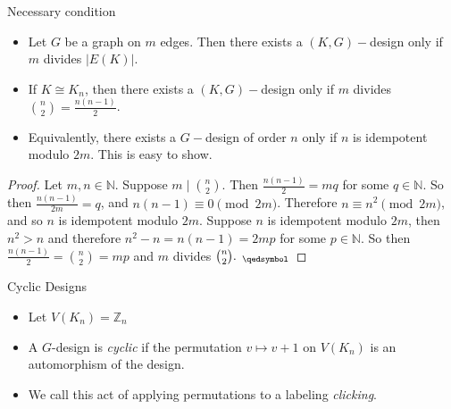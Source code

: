 \documentclass[xcolor=x11names,compress,8pt]{beamer}
\theoremstyle{plain}
\begin{document}
\begin{frame}{Necessary condition}
\begin{itemize}
\item Let $G$ be a graph on $m$ edges. Then there exists a $(K,G)-$design only if $m$ divides $|E(K)|$.
\pause
\item If $K\cong K_{n}$, then there exists a $(K,G)-$design only if $m$ divides $\binom{n}{2}=\frac{n(n-1)}{2}$.
\pause
\item Equivalently, there exists a $G-$design of order $n$ only if $n$ is idempotent modulo $2m$.  This is easy to show.
\pause
\end{itemize}

\begin{proof}
    Let $m,n\in \mathbb{N}$. Suppose $m \mid \binom{n}{2}$. Then $\frac{n(n-1)}{2} = mq$ for some $q \in \mathbb{N}$. So then $\frac{n(n-1)}{2m} = q$, and $n(n-1) \equiv 0 \pmod{2m}$. Therefore $n \equiv n^2 \pmod{2m}$, and so $n$ is idempotent modulo $2m$. Suppose $n$ is idempotent modulo $2m$, then $n^{2}>n$ and therefore $n^{2}-n=n(n-1)=2mp$ for some $p\in \mathbb{N}$. So then $\frac{n(n-1)}{2}=\binom{n}{2}=mp$ and $m$ divides $\binom{n}{2}._{\;\;\qedsymbol}$ 
    \end{proof}
\end{frame}
\begin{frame}{Cyclic Designs}
    \pause
    \begin{itemize}
    \item Let $V(K_n)=\mathbb{Z}_n$
    \pause
    \item A $G$-design is \emph{cyclic} if the permutation $v\mapsto v+1$ on $V(K_n)$ is an automorphism of the design.
    \pause
    \item We call this act of applying permutations to a labeling \emph{clicking}.
    \end{itemize}
    \end{frame}
\end{document}
